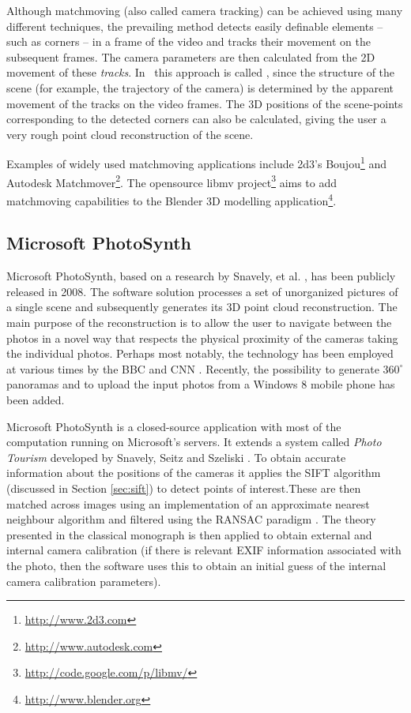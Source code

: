Although matchmoving (also called camera tracking) can be achieved using many different techniques, the prevailing method detects easily definable elements -- such as corners -- in a frame of the video and tracks their movement on the subsequent frames. 
The camera parameters are then calculated from the 2D movement of these {\it tracks}. 
In \cv\, this approach is called , since the structure of the scene (for example, the trajectory of the camera) is determined by the apparent movement of the tracks on the video frames.  
The 3D positions of the scene-points corresponding to the detected corners can also be calculated, giving the user a very rough point cloud reconstruction of the scene.

Examples of widely used matchmoving applications include 2d3's Boujou\footnote{\url{http://www.2d3.com}} and Autodesk Matchmover\footnote{\url{http://www.autodesk.com}}.
The opensource libmv project\footnote{\url{http://code.google.com/p/libmv/}} aims to add matchmoving capabilities to the Blender 3D modelling application\footnote{\url{http://www.blender.org}}.

\subsection{Microsoft PhotoSynth} 

Microsoft PhotoSynth, based on a research by Snavely, et al. \cite{snavely2008}, has been publicly released in 2008. 
The software solution processes a set of unorganized pictures of a single scene and subsequently generates its 3D point cloud reconstruction. 
The main purpose of the reconstruction is to allow the user to navigate between the photos in a novel way that respects the physical proximity of the cameras taking the individual photos. 
Perhaps most notably, the technology has been employed at various times by the BBC and CNN \cite{cnnsynth}. 
Recently, the possibility to generate $360^\circ$ panoramas and to upload the input photos from a Windows 8 mobile phone has been added. 

Microsoft PhotoSynth is a closed-source application with most of the computation running on Microsoft's servers. 
It extends a system called {\it Photo Tourism} developed by Snavely, Seitz and Szeliski \cite{snavely2007, snavely2006}.
To obtain accurate information about the positions of the cameras it applies the SIFT algorithm (discussed in Section \ref{sec:sift}) to detect points of interest.These are then matched across images using an implementation of an approximate nearest neighbour algorithm and filtered using the RANSAC paradigm \cite{ransac}.
The theory presented in the classical monograph \cite{multipleview} is then applied to obtain external and internal camera calibration (if there is relevant EXIF information associated with the photo, then the software uses this to obtain an initial guess of the internal camera calibration parameters).
 
